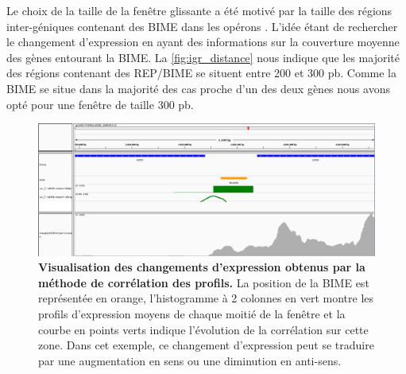 \documentclass[12pt,a4paper]{report}
\begin{document}
\begin{onehalfspace}
Le choix de la taille de la fenêtre glissante a été motivé par la taille des régions inter-géniques contenant des BIME dans les opérons . L'idée étant de rechercher le changement d'expression en ayant des informations sur la couverture moyenne des gènes entourant la BIME. La \autoref{fig:igr_distance} nous indique que les majorité des régions contenant des REP/BIME se situent entre 200 et 300 pb. Comme la BIME se situe dans la majorité des cas proche d'un des deux gènes nous avons opté pour une fenêtre de taille 300 pb.
\begin{figure}
\end{figure}

\begin{figure}[ht]
\centerline{\includegraphics[scale=0.27]{figures/igv_profil.png}}
\caption{\textbf{Visualisation des changements d'expression obtenus par la méthode de corrélation des profils.} La position de la BIME est représentée en orange, l'histogramme à 2 colonnes en vert montre les profils d'expression moyens de chaque moitié de la fenêtre et la courbe en points verts indique l'évolution de la corrélation sur cette zone. Dans cet exemple, ce changement d'expression peut se traduire par une augmentation en sens ou une diminution en anti-sens.}
\label{fig:igv_profil} 
\end{figure}


\end{onehalfspace}
\end{document}
